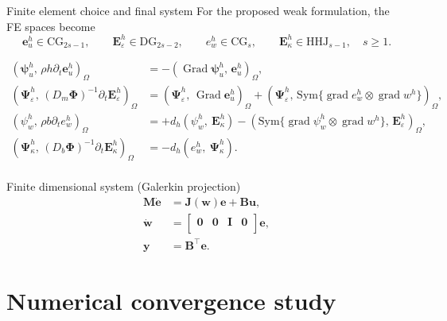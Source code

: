 \documentclass[aspectratio=169]{beamer}
\DeclareMathOperator*{\grad}{grad}
\DeclareMathOperator*{\Grad}{Grad}
\newcommand{\inpr}[3][]{\ensuremath{( #2, \, #3 )_{#1}}}
\begin{document}
\begin{frame}{Finite element choice and final system}
	For the proposed weak formulation, the FE spaces become
	\begin{equation*}
			\bm{e}_u^h \in \mathrm{CG}_{2s-1}, \qquad
			\bm{E}_{\varepsilon}^h \in \mathrm{DG}_{2s-2}, \qquad 
			e_w^h \in \mathrm{CG}_{s}, \qquad \bm{E}_\kappa^h \in \mathrm{HHJ}_{s-1}, \quad s\ge 1.
	\end{equation*}

\begin{equation*}
	\begin{aligned}
		\inpr[\Omega]{\bm{\psi}_u^h}{\rho h \partial_t \bm{e}_u^h} &= -\inpr[\Omega]{\Grad \bm{\psi}_u^h}{\bm{e}_u^h}, \\
		\inpr[\Omega]{\bm{\Psi}_\varepsilon^h}{(D_m \bm{\Phi})^{-1} \partial_t \bm{E}_{\varepsilon}^h} &= \inpr[\Omega]{\bm{\Psi}_\varepsilon^h}{\Grad \bm{e}_u^h} + \inpr[\Omega]{\bm{\Psi}_\varepsilon^h}{\mathrm{Sym}\{\grad e_w^h \otimes \grad w^h\}}, \\
		\inpr[\Omega]{\psi_w^h}{\rho b \partial_t {e}_w^h} &= +d_h(\psi_w^h, \ \bm{E}_{\kappa}^h) - \inpr[\Omega]{\mathrm{Sym}\{\grad \psi_w^h \otimes \grad w^h\}}{\bm{E}_\varepsilon^h}, \\ 
		\inpr[\Omega]{\bm{\Psi}_\kappa^h}{(D_b \bm{\Phi})^{-1}\partial_t {\bm{E}}_\kappa^h} &= -d_h(e_w^h, \ \bm{\Psi}_{\kappa}^h). \\ 
	\end{aligned}
\end{equation*}

\begin{block}{Finite dimensional system (Galerkin projection)}
		\begin{equation*}
		\begin{aligned}
			\mathbf{M} \dot{\mathbf{e}} &= \mathbf{J}(\mathbf{w})\mathbf{e} + \mathbf{B}\mathbf{u}, \\
			\dot{\mathbf{w}} &= \begin{bmatrix}
				\mathbf{0} & \mathbf{0} & \mathbf{I} & \mathbf{0} \\
			\end{bmatrix} \mathbf{e}, \\
			\mathbf{y} &= \mathbf{B}^\top \mathbf{e}.
		\end{aligned}
	\end{equation*}
\end{block}

\end{frame}


\section{Numerical convergence study}
\end{document}
